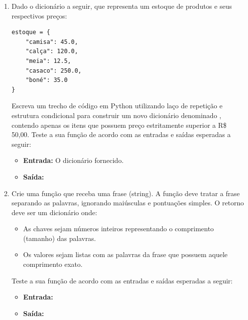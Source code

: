 \begin{enumerate}[label=\textbf{Q\arabic*.}]



\item Dado o dicionário a seguir, que representa um estoque de produtos e seus respectivos preços:
\begin{verbatim}
estoque = {
    "camisa": 45.0,
    "calça": 120.0,
    "meia": 12.5,
    "casaco": 250.0,
    "boné": 35.0
}
\end{verbatim}
Escreva um trecho de código em Python utilizando laço de repetição e estrutura condicional para construir um novo dicionário denominado , contendo apenas os itens que possuem preço estritamente superior a R\$ 50,00. Teste a sua função de acordo com as entradas e saídas esperadas a seguir:

\begin{itemize}
    \item \textbf{Entrada:} O dicionário  fornecido.
    \item \textbf{Saída:} 
\end{itemize}



\item Crie uma função  que receba uma frase (string). A função deve tratar a frase separando as palavras, ignorando maiúsculas e pontuações simples. O retorno deve ser um dicionário onde:
\begin{itemize}
    \item As chaves sejam números inteiros representando o comprimento (tamanho) das palavras.
    \item Os valores sejam listas com as palavras da frase que possuem aquele comprimento exato.
\end{itemize}

Teste a sua função de acordo com as entradas e saídas esperadas a seguir:

\begin{itemize}
    \item \textbf{Entrada:} 
    \item \textbf{Saída:} \\
\end{itemize}





\end{enumerate}
